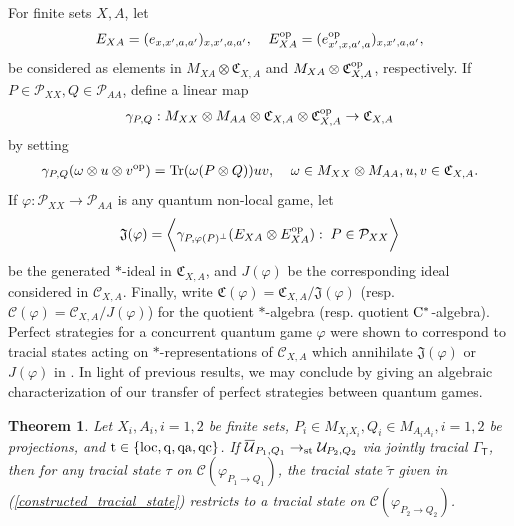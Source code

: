 \documentclass[11pt]{amsart}
\newtheorem{theorem}{Theorem}[section]
\newcommand{\cl}[1]{\mathcal{#1}}
\begin{document}
For finite sets $X, A$, let
\begin{gather*}
	E_{XA} = (e_{x, x', a, a'})_{x, x', a, a'}, \;\;\;\; E_{XA}^{\rm op} = (e_{x', x, a', a}^{\rm op})_{x, x', a, a'},
\end{gather*}
\noindent be considered as elements in $M_{XA}\otimes \mathfrak{C}_{X, A}$ and $M_{XA}\otimes \mathfrak{C}_{X, A}^{\rm op}$, respectively. If $P \in \cl{P}_{XX}, Q \in \cl{P}_{AA}$, define a linear map
\begin{gather}\label{alg_map}
	\gamma_{P, Q}: M_{XX}\otimes M_{AA}\otimes \mathfrak{C}_{X, A}\otimes \mathfrak{C}_{X, A}^{\rm op} \rightarrow \mathfrak{C}_{X, A}
\end{gather}
\noindent by setting
\begin{gather*}
	\gamma_{P, Q}(\omega\otimes u\otimes v^{\rm op}) = {\rm Tr}(\omega(P\otimes Q))uv, \;\;\;\; \omega \in M_{XX}\otimes M_{AA}, u, v \in \mathfrak{C}_{X, A}. 
\end{gather*}
\noindent If $\varphi: \cl{P}_{XX}\rightarrow \cl{P}_{AA}$ is any quantum non-local game, let
\begin{gather*}
	\mathfrak{J}(\varphi) = \bigg\langle \gamma_{P, \varphi(P)^{\perp}}(E_{XA}\otimes E_{XA}^{\rm op}): \; P \in \cl{P}_{XX}\bigg\rangle
\end{gather*}
\noindent be the generated $*$-ideal in $\mathfrak{C}_{X, A}$, and $J(\varphi)$ be the corresponding ideal considered in $\cl{C}_{X, A}$. Finally, write $\mathfrak{C}(\varphi) = \mathfrak{C}_{X, A}/\mathfrak{J}(\varphi)$ (resp. $\cl{C}(\varphi) = \cl{C}_{X, A}/J(\varphi)$) for the quotient $*$-algebra (resp. quotient ${\rm C}^{*}$-algebra). Perfect strategies for a concurrent quantum game $\varphi$ were shown to correspond to tracial states acting on $*$-representations of $\cl{C}_{X, A}$ which annihilate $\mathfrak{J}(\varphi)$ or $J(\varphi)$ in \cite{synch_bhtt, bhtt}. In light of previous results, we may conclude by giving an algebraic characterization of our transfer of perfect strategies between quantum games.
\begin{theorem}
Let $X_{i}, A_{i}, i = 1, 2$ be finite sets, $P_{i} \in M_{X_{i}X_{i}}, Q_{i} \in M_{A_{i}A_{i}}, i = 1, 2$ be projections, and ${\rm t} \in \{\rm loc, q, qa, qc\}$. If $\overline{\cl{U}}_{P_{1}, Q_{1}}\rightarrow_{\rm st} \cl{U}_{P_{2}, Q_{2}}$ via jointly tracial $\Gamma_{\mathsf{T}}$, then for any tracial state $\tau$ on $\cl{C}(\varphi_{P_{1}\rightarrow Q_{1}})$, the tracial state $\tilde{\tau}$ given in (\ref{constructed_tracial_state}) restricts to a tracial state on $\cl{C}(\varphi_{P_{2}\rightarrow Q_{2}})$.  
\end{theorem}
\end{document}
